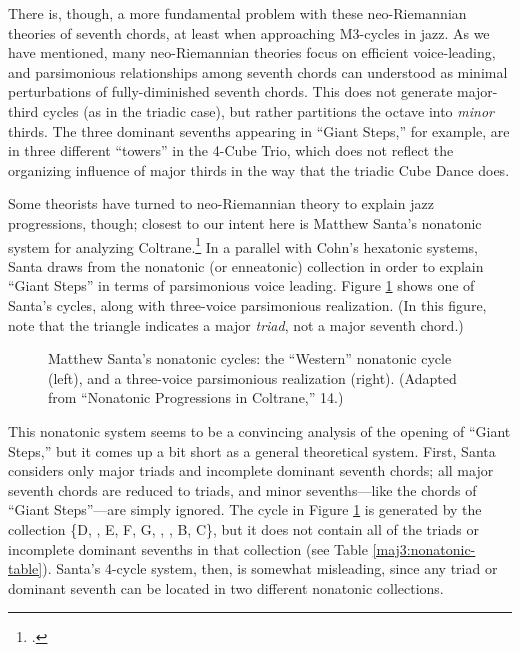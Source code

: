 There is, though, a more fundamental problem with these neo-Riemannian theories
of seventh chords, at least when approaching M3-cycles in jazz. As we have
mentioned, many neo-Riemannian theories focus on
efficient voice-leading, and parsimonious relationships among seventh chords
can understood as minimal perturbations of fully-diminished seventh
chords. This does not generate major-third cycles (as in the
triadic case), but rather partitions the octave into \emph{minor} thirds. The
three dominant sevenths appearing in ``Giant Steps,'' for example, are in
three different ``towers'' in the 4-Cube Trio, which does not reflect
the organizing influence of major thirds in the way that the triadic Cube
Dance does.

Some theorists have turned to neo-Riemannian theory to explain jazz
progressions, though; closest to our intent here is Matthew Santa's nonatonic
system for analyzing Coltrane.\footcite{santa:2003} In a parallel with Cohn's
hexatonic systems, Santa draws from the nonatonic (or enneatonic) collection
in order to explain ``Giant Steps'' in terms of parsimonious voice leading.
Figure \ref{maj3:nonatonic-cycle} shows one of Santa's cycles, along with
three-voice parsimonious realization. (In this figure, note that the triangle
indicates a major \emph{triad}, not a major seventh chord.)
%
\begin{figure}[tbp]
  \caption[Matthew Santa's nonatonic cycles.]{Matthew Santa's nonatonic
    cycles: the ``Western'' nonatonic cycle (left), and a three-voice parsimonious
    realization (right). (Adapted from ``Nonatonic Progressions in Coltrane,''
    14.)}
\label{maj3:nonatonic-cycle}
\end{figure}
%
This nonatonic system seems to be a convincing analysis of the opening of
``Giant Steps,'' but it comes up a bit short as a general theoretical system.
First, Santa considers only major triads and incomplete dominant seventh
chords; all major seventh chords are reduced to triads, and minor
sevenths---like the \ii chords of ``Giant Steps''---are simply
ignored. The cycle in Figure \ref{maj3:nonatonic-cycle} is
generated by the collection \{D, \Eflat, E, F\sharp, G, \Aflat, \Bflat, B,
C\}, but it does not contain all of the triads or incomplete dominant sevenths
in that collection (see Table \ref{maj3:nonatonic-table}). Santa's 4-cycle
system, then, is somewhat misleading, since any triad or dominant seventh can
be located in two different nonatonic collections.

